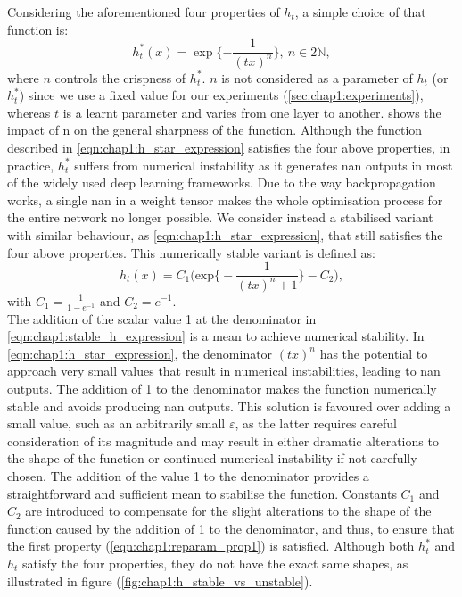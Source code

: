Considering the aforementioned four properties of $h_t$, a simple choice of that
function is:
\begin{equation}
  \label{eqn:chap1:h_star_expression}
  h_t^*(x) = \exp\bigg\{{-\displaystyle\frac{1}{(tx)^n}}\bigg\}, ~ n\in 2\mathds{N},
\end{equation}
\noindent where $n$ controls the crispness of $h_t^*$. $n$ is not considered as
a parameter of $h_t$ (or $h_t^*$) since we use a fixed value for our experiments
(\cref{sec:chap1:experiments}), whereas $t$ is a learnt parameter and varies
from one layer to another.  shows the
impact of n on the general sharpness of the function. Although the function
described in \cref{eqn:chap1:h_star_expression} satisfies the four above
properties, in practice, $h_t^*$ suffers from numerical instability as it
generates \ac{nan} outputs in most of the widely used deep learning frameworks.
Due to the way backpropagation works, a single \ac{nan} in a weight tensor makes
the whole optimisation process for the entire network no longer possible. We
consider instead a stabilised variant with similar behaviour, as
\cref{eqn:chap1:h_star_expression},  that still satisfies the four above
properties. This numerically stable variant is defined as:
\begin{equation}
  \label{eqn:chap1:stable_h_expression}
  h_t(x) = C_1 \biggl( \text{exp} \bigg\{-\displaystyle\frac{1}{(tx)^n +1}\bigg\} - C_2 \biggr),
\end{equation}
\noindent with $C_1=\frac{1}{1-e^{-1}}$ and $C_2 = e^{-1}$.\\

The addition of the scalar value 1 at the denominator in
\cref{eqn:chap1:stable_h_expression} is a mean to achieve numerical stability.
In \cref{eqn:chap1:h_star_expression}, the denominator $(tx)^n$ has the
potential to approach very small values that result in numerical instabilities,
leading to \ac{nan} outputs. The addition of 1 to the denominator makes the
function numerically stable and avoids producing \ac{nan} outputs. This solution
is favoured over adding a small value, such as an arbitrarily small
$\varepsilon$, as the latter requires careful consideration of its magnitude and
may result in either dramatic alterations to the shape of the function or
continued numerical instability if not carefully chosen. The addition of the
value 1 to the denominator provides a straightforward and sufficient mean to
stabilise the function. Constants $C_1$ and $C_2$ are introduced to compensate
for the slight alterations to the shape of the function caused by the addition
of 1 to the denominator, and thus, to ensure that the first property
(\cref{eqn:chap1:reparam_prop1}) is satisfied. Although both $h_t^*$ and $h_t$
satisfy the four properties, they do not have the exact same shapes, as
illustrated in figure (\ref{fig:chap1:h_stable_vs_unstable}).\\

